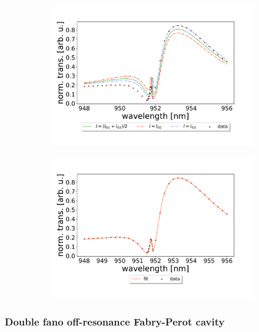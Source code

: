 \begin{figure}[h!]
    \centering
    \begin{subfigure}[b]{0.49\textwidth}
        \centering
        \includegraphics[width=\textwidth]{figures/results/34um_long_scan_sim_comparison.pdf}
        \caption{}
        \label{fig:34um_long_scan_sim_comparison}
    \end{subfigure}
    \begin{subfigure}[b]{0.49\textwidth}
        \centering
        \includegraphics[width=\textwidth]{figures/results/34um_long_scan_fit.pdf}
        \caption{}
        \label{fig:34um_long_scan_fit}
    \end{subfigure}
\end{figure}


\subsubsection{Double fano off-resonance Fabry-Perot cavity}

